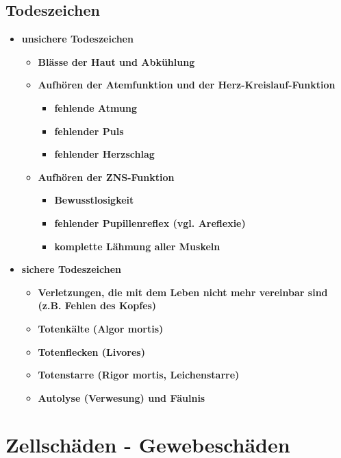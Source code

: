 \subsection{Todeszeichen}
	\begin{itemize}
		\item \textbf{unsichere Todeszeichen}
			\begin{itemize}
				\item \textbf{Blässe der Haut und Abkühlung}
				\item \textbf{Aufhören der Atemfunktion und der Herz-Kreislauf-Funktion}
					\begin{itemize}
						\item \textbf{fehlende Atmung}
						\item \textbf{fehlender Puls}
						\item \textbf{fehlender Herzschlag}
					\end{itemize}
				\item \textbf{Aufhören der ZNS-Funktion}
					\begin{itemize}
						\item \textbf{Bewusstlosigkeit}
						\item \textbf{fehlender Pupillenreflex (vgl. Areflexie)}
						\item \textbf{komplette Lähmung aller Muskeln}
					\end{itemize}
			\end{itemize}
		\item \textbf{sichere Todeszeichen}
			\begin{itemize}
				\item \textbf{Verletzungen, die mit dem Leben nicht mehr vereinbar sind (z.B. Fehlen des Kopfes)}
				\item \textbf{Totenkälte (Algor mortis)}
				\item \textbf{Totenflecken (Livores)}
				\item \textbf{Totenstarre (Rigor mortis, Leichenstarre)}
				\item \textbf{Autolyse (Verwesung) und Fäulnis}
			\end{itemize}
	\end{itemize}

\section{Zellschäden - Gewebeschäden}

